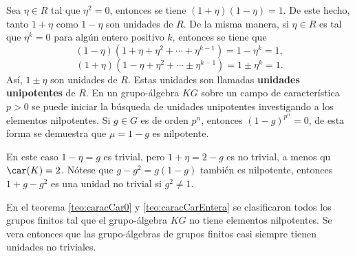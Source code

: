 \begin{ejemplo}\label{ejem:unipotentes}
Sea $\eta \in R$ tal que $\eta^2 =0$, entonces se tiene $(1+\eta)(1-\eta)=1$. De este hecho, tanto $1+\eta$ como $1-\eta$ son unidades de $R$. De la misma manera, si $\eta \in R$ es tal que $\eta ^k =0$ para algún entero positivo $k$, entonces se tiene que
\begin{equation*}
(1-\eta)(1+\eta+\eta^2+\cdots+\eta^{k-1}) =  1-\eta^{k} = 1,
\end{equation*}
\begin{equation*}
(1+\eta)(1-\eta+\eta^2+\cdots\pm \eta^{k-1}) =  1 \pm \eta^{k} = 1.
\end{equation*}
Así, $1\pm \eta$ son unidades de $R$. Estas unidades son llamadas \textbf{unidades unipotentes} de $R$. En un grupo-álgebra $KG$ sobre un campo de característica $p>0$ se puede iniciar la búsqueda de unidades unipotentes investigando a los elementos nilpotentes. Si $g \in G$ es de orden $p^n$, entonces $(1-g)^{p^n} = 0$, de esta forma se demuestra que $\mu = 1-g$ es nilpotente.

En este caso $1-\eta = g$ es trivial, pero $1+\eta = 2-g$ es no trivial, a menos qu $\car(K)=2$. Nótese que $g-g^2=g(1-g)$ también es nilpotente, entonces $1+g-g^2$ es una unidad no trivial si $g^2 \neq 1$.

En el teorema \ref{teo:caracCar0} y \ref{teo:caracCarEntera} se clasificaron  todos los grupos finitos tal que el grupo-álgebra $KG$ no tiene elementos nilpotentes. Se vera entonces que las grupo-álgebras de grupos finitos casi siempre tienen unidades no triviales.
\end{ejemplo}

